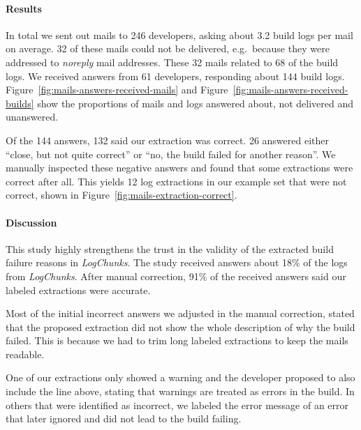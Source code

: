 \documentclass[\myrootdir/main.tex]{subfiles}
\begin{document}
\paragraph{Results}
In total we sent out mails to 246 developers, asking about 3.2 build logs per mail on average.
32 of these mails could not be delivered, e.g.\ because they were addressed to \emph{noreply} mail addresses.
These 32 mails related to 68 of the build logs.
We received answers from 61 developers, responding about 144 build logs.
Figure~\ref{fig:mails-answers-received-mails} and Figure~\ref{fig:mails-answers-received-builds} show the proportions of mails and logs answered about, not delivered and unanswered.

Of the 144 answers, 132 said our extraction was correct.
26 answered either ``close, but not quite correct'' or ``no, the build failed for another reason''.
We manually inspected these negative answers and found that some extractions were correct after all.
This yields 12 log extractions in our example set that were not correct, shown in Figure~\ref{fig:mails-extraction-correct}.

\paragraph{Discussion}
This study highly strengthens the trust in the validity of the extracted build failure reasons in \emph{LogChunks}.
The study received answers about 18\% of the logs from \emph{LogChunks}.
After manual correction, 91\% of the received answers said our labeled extractions were accurate.

Most of the initial incorrect answers we adjusted in the manual correction, stated that the proposed extraction did not show the whole description of why the build failed.
This is because we had to trim long labeled extractions to keep the mails readable.

One of our extractions only showed a warning and the developer proposed to also include the line above, stating that warnings are treated as errors in the build.
In others that were identified as incorrect, we labeled the error message of an error that later ignored and did not lead to the build failing.
\end{document}
